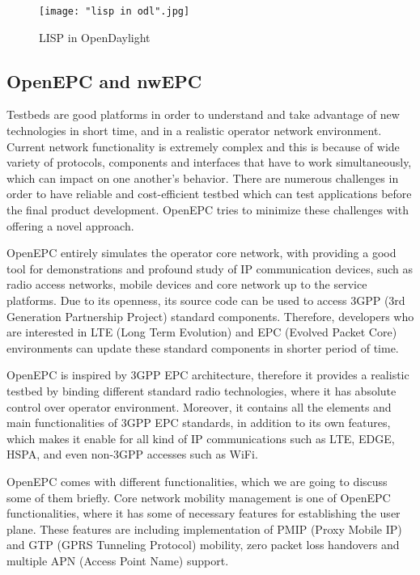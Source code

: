 \documentclass[english]{tktltiki2}
\theoremstyle{definition}
\theoremstyle{remark}
\begin{document}
{\begin{figure}[h!t]
\centering
{}
\texttt{[image: "lisp in odl".jpg]}
\caption{LISP in OpenDaylight \cite{ODLLISP}}
\label{fig:LispInODL}
\end{figure}



\subsection{OpenEPC and nwEPC}

Testbeds are good platforms in order to understand and take advantage of new technologies in short time, and in a realistic operator network environment. Current network functionality is extremely complex and this is because of wide variety of protocols, components and interfaces that have to work simultaneously, which can impact on one another’s behavior. There are numerous challenges in order to have reliable and cost-efficient testbed which can test applications before the final product development. OpenEPC tries to minimize these challenges with offering a novel approach. \cite{OpenEPC}

OpenEPC entirely simulates the operator core network, with providing a good tool for demonstrations and profound study of IP communication devices, such as radio access networks, mobile devices and core network up to the service platforms. Due to its openness, its source code can be used to access 3GPP (3rd Generation Partnership Project) standard components. Therefore, developers who are interested in LTE (Long Term Evolution) and EPC (Evolved Packet Core) environments can update these standard components in shorter period of time. \cite{OpenEPC}

OpenEPC is inspired by 3GPP EPC architecture, therefore it provides a realistic testbed by binding different standard radio technologies, where it has absolute control over operator environment. Moreover, it contains all the elements and main functionalities of 3GPP EPC standards, in addition to its own features, which makes it enable for all kind of IP communications such as LTE, EDGE, HSPA, and even non-3GPP accesses such as WiFi. \cite{OpenEPC}

OpenEPC comes with different functionalities, which we are going to discuss some of them briefly. Core network mobility management is one of OpenEPC functionalities, where it has some of necessary features for establishing the user plane. These features are including  implementation of PMIP (Proxy Mobile IP) and GTP (GPRS Tunneling Protocol) mobility, zero packet loss handovers and multiple APN (Access Point Name) support.  \cite{OpenEPC}

}
\end{document}
